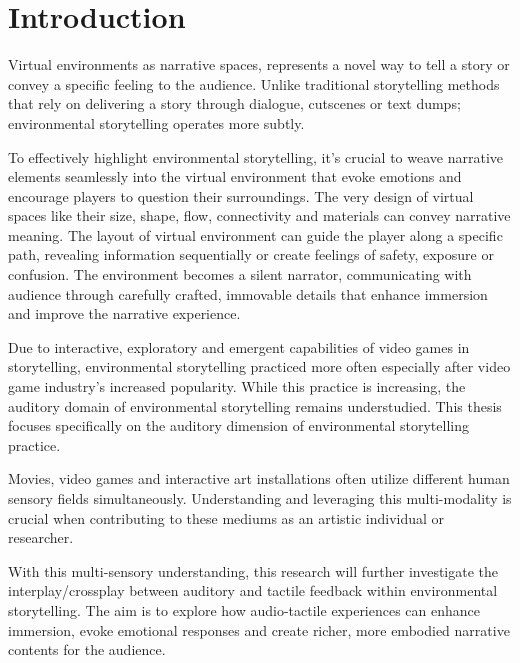 \chapter{Introduction}
Virtual environments as narrative spaces, represents a novel way to tell a story or convey a specific feeling to the audience. Unlike traditional storytelling methods that rely on delivering a story through dialogue, cutscenes or text dumps; environmental storytelling operates more subtly.\par

To effectively highlight environmental storytelling, it’s crucial to weave narrative elements seamlessly into the virtual environment that evoke emotions and encourage players to question their surroundings. The very design of virtual spaces like their size, shape, flow, connectivity and materials can convey narrative meaning. The layout of virtual environment can guide the player along a specific path, revealing information sequentially or create feelings of safety, exposure or confusion. The environment becomes a silent narrator, communicating with audience through carefully crafted, immovable details that enhance immersion and improve the narrative experience\cite{Environmental_Storytelling_Blogpost}.\par

Due to interactive, exploratory and emergent capabilities of video games in storytelling, environmental storytelling practiced more often especially after video game industry's increased popularity\cite{Video_Game_Industry_Stat}. While this practice is increasing, the auditory domain of environmental storytelling remains understudied. This thesis focuses specifically on the auditory dimension of environmental storytelling practice.\par

Movies, video games and interactive art installations often utilize different human sensory fields simultaneously. Understanding and leveraging this multi-modality is crucial when contributing to these mediums as an artistic individual or researcher.\par

With this multi-sensory understanding, this research will further investigate the interplay/crossplay between auditory and tactile feedback within environmental storytelling. The aim is to explore how audio-tactile experiences can enhance immersion, evoke emotional responses and create richer, more embodied narrative contents for the audience.\par
